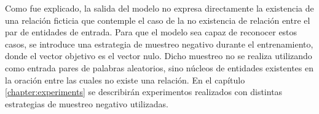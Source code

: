 Como fue explicado, la salida del modelo no expresa directamente la existencia de una relación ficticia que contemple el caso de la no existencia de relación entre el par de entidades de entrada.
Para que el modelo sea capaz de reconocer estos casos, se introduce una estrategia de muestreo negativo durante el entrenamiento, donde el vector objetivo es el vector nulo.
Dicho muestreo no se realiza utilizando como entrada pares de palabras aleatorios, sino núcleos de entidades existentes en la oración entre las cuales no existe una relación.
En el capítulo \ref{chapter:experiments} se describirán experimentos realizados con distintas estrategias de muestreo negativo utilizadas.

